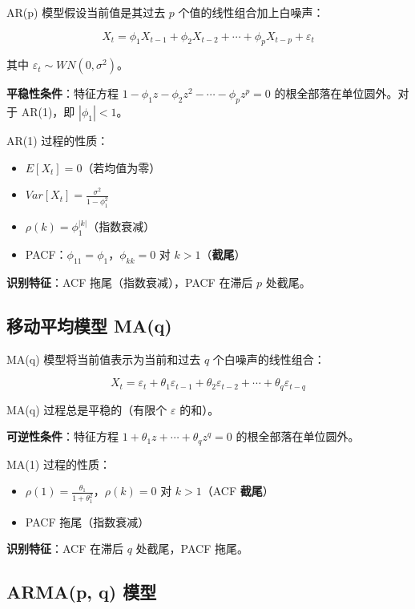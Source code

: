 \documentclass[
]{book}
\providecommand{\tightlist}{%
  \setlength{\itemsep}{0pt}\setlength{\parskip}{0pt}}
\begin{document}
AR(p) 模型假设当前值是其过去 \(p\) 个值的线性组合加上白噪声：

\[X_t = \phi_1 X_{t-1} + \phi_2 X_{t-2} + \cdots + \phi_p X_{t-p} + \varepsilon_t\]

其中 \(\varepsilon_t \sim WN(0, \sigma^2)\)。

\textbf{平稳性条件}：特征方程 \(1 - \phi_1 z - \phi_2 z^2 - \cdots - \phi_p z^p = 0\) 的根全部落在单位圆外。对于 AR(1)，即 \(|\phi_1| < 1\)。

AR(1) 过程的性质：

\begin{itemize}
\tightlist
\item
  \(E[X_t] = 0\)（若均值为零）
\item
  \(Var[X_t] = \frac{\sigma^2}{1 - \phi_1^2}\)
\item
  \(\rho(k) = \phi_1^{|k|}\)（指数衰减）
\item
  PACF：\(\phi_{11} = \phi_1\)，\(\phi_{kk} = 0\) 对 \(k > 1\)（\textbf{截尾}）
\end{itemize}

\textbf{识别特征}：ACF 拖尾（指数衰减），PACF 在滞后 \(p\) 处截尾。

\subsection{移动平均模型 MA(q)}\label{ux79fbux52a8ux5e73ux5747ux6a21ux578b-maq}

MA(q) 模型将当前值表示为当前和过去 \(q\) 个白噪声的线性组合：

\[X_t = \varepsilon_t + \theta_1 \varepsilon_{t-1} + \theta_2 \varepsilon_{t-2} + \cdots + \theta_q \varepsilon_{t-q}\]

MA(q) 过程总是平稳的（有限个 \(\varepsilon\) 的和）。

\textbf{可逆性条件}：特征方程 \(1 + \theta_1 z + \cdots + \theta_q z^q = 0\) 的根全部落在单位圆外。

MA(1) 过程的性质：

\begin{itemize}
\tightlist
\item
  \(\rho(1) = \frac{\theta_1}{1 + \theta_1^2}\)，\(\rho(k) = 0\) 对 \(k > 1\)（ACF \textbf{截尾}）
\item
  PACF 拖尾（指数衰减）
\end{itemize}

\textbf{识别特征}：ACF 在滞后 \(q\) 处截尾，PACF 拖尾。

\subsection{ARMA(p, q) 模型}\label{armap-q-ux6a21ux578b}
\end{document}
